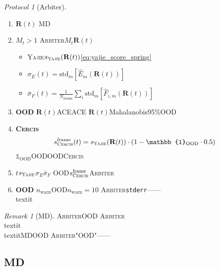 \documentclass[12pt,a4paper]{article}
\theoremstyle{remark}
\newtheorem{remark}[theorem]{Remark}
\newtheorem{protocol}[theorem]{Protocol}
\newcommand{\Yajie}{\textsc{Yajie}}
\newcommand{\Cercis}{\textsc{Cercis}}
\newcommand{\Arbiter}{\textsc{Arbiter}}
\begin{document}
\begin{protocol}[Arbiter]\label{prot:audit_hook}
\begin{enumerate}[label= \arabic*,leftmargin=*,itemsep=3pt]
    \item \textbf{$\mathbf{R}(t)$} MD

    \item \textbf{} $M_t>1$
    \Arbiter{}$M_t$$\mathbf{R}(t)$
    \begin{itemize}[nosep]
        \item \Yajie{}$s_{\Yajie}(\mathbf{R}(t))$\eqref{eq:yajie_score_spring}
        \item $\sigma_E(t) = \text{std}_m[\hat{E}_m(\mathbf{R}(t))]$
        \item $\bar{\sigma}_F(t) = \frac{1}{N_{\text{atoms}}}\sum_i \text{std}_m[\hat{F}_{i,m}(\mathbf{R}(t))]$
    \end{itemize}

    \item \textbf{OOD} $\mathbf{R}(t)$ACEACE
    $\mathbf{R}(t)$Mahalanobis95\%OOD

    \item \textbf{\Cercis{}}
    \begin{equation}
        s_{\Cercis}^{\text{frame}}(t) = s_{\Yajie}(\mathbf{R}(t)) \cdot (1 - \mathbb{1}_{\text{OOD}} \cdot 0.5)
    \end{equation}
    $\mathbb{1}_{\text{OOD}}$OODOOD\Cercis{}

    \item \textbf{} $t$$s_{\Yajie}$$\sigma_E$$\bar{\sigma}_F$
    OOD$s_{\Cercis}^{\text{frame}}$\Arbiter{}

    \item \textbf{OOD} $n_{\text{warn}}$OOD$n_{\text{warn}}=10$
    \Arbiter{}\texttt{stderr}——\\textit{}
\end{enumerate}
\end{protocol}

\begin{remark}[MD]
\Arbiter{}OOD
\textbf{}\Arbiter{}\\textit{}
\\textit{}MDOOD
\Arbiter{}"OOD"——

\end{remark}

\subsection{MD}
\end{document}
